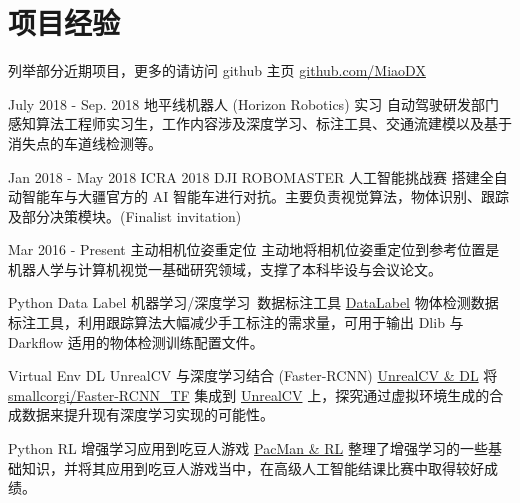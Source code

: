 \documentclass[utf8]{twentysecondcv} %
\begin{document}
\section{项目经验}
\begin{twenty}

    \twentyitem
        {}
        {}        
        {列举部分近期项目，更多的请访问 github 主页}
        {\href{https://github.com/MiaoDX/}{github.com/MiaoDX}}
        {}
        {}
    
        
    \twentyitem
    {July 2018 - }
    {Sep. 2018}
    {地平线机器人 (Horizon Robotics) 实习}
    {}
    {}
    {自动驾驶研发部门感知算法工程师实习生，工作内容涉及深度学习、标注工具、交通流建模以及基于消失点的车道线检测等。}
          
    \twentyitem
    {Jan 2018 - }
    {May 2018}
    {ICRA 2018 DJI ROBOMASTER 人工智能挑战赛}
    {}
    {}
    {搭建全自动智能车与大疆官方的 AI 智能车进行对抗。主要负责视觉算法，物体识别、跟踪及部分决策模块。(Finalist invitation)}
    
    \twentyitem
    {Mar 2016 -}
    {Present}
    {主动相机位姿重定位}
    {}
    {}
	{主动地将相机位姿重定位到参考位置是机器人学与计算机视觉一基础研究领域，支撑了本科毕设与会议论文。}
    
	\twentyitem
        {Python}
		{Data Label}
        {机器学习/深度学习\ 数据标注工具}
        {\href{https://github.com/MiaoDX/DataLabel}{DataLabel}}
        {}
        {物体检测数据标注工具，利用跟踪算法大幅减少手工标注的需求量，可用于输出 Dlib 与 Darkflow 适用的物体检测训练配置文件。}
          
    \twentyitem
        {Virtual Env}
      	{DL}
        {UnrealCV 与深度学习结合 (Faster-RCNN)}
        {\href{https://github.com/MiaoDX/unrealcv_examples/}{UnrealCV \& DL}}
        {}
        {将 \href{https://github.com/smallcorgi/Faster-RCNN\_TF}{smallcorgi/Faster-RCNN\_TF} 集成到 \href{https://github.com/unrealcv/unrealcv}{UnrealCV} 上，探究通过虚拟环境生成的合成数据来提升现有深度学习实现的可能性。}
                 
    \twentyitem
        {Python}
		{RL}
        {增强学习应用到吃豆人游戏}
        {\href{https://github.com/MiaoDX/hand_in_homework/tree/master/Advanced\_AI/}{PacMan \& RL}}
        {}
        {整理了增强学习的一些基础知识，并将其应用到吃豆人游戏当中，在高级人工智能结课比赛中取得较好成绩。}
        

\end{twenty}
\end{document}
